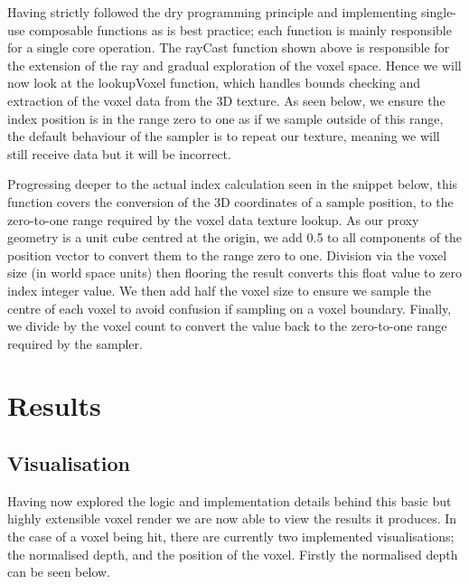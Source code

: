 \documentclass[titlepage]{article}
\begin{document}


Having strictly followed the \gls{dry} programming principle and implementing single-use composable functions as is best practice; each function is mainly responsible for a single core operation. The rayCast function shown above is responsible for the extension of the ray and gradual exploration of the voxel space. Hence we will now look at the lookupVoxel function, which handles bounds checking and extraction of the voxel data from the 3D texture. As seen below, we ensure the index position is in the range zero to one as if we sample outside of this range, the default behaviour of the sampler is to repeat our texture, meaning we will still receive data but it will be incorrect.



Progressing deeper to the actual index calculation seen in the snippet below, this function covers the conversion of the 3D coordinates of a sample position, to the zero-to-one range required by the voxel data texture lookup. As our proxy geometry is a unit cube centred at the origin, we add 0.5 to all components of the position vector to convert them to the range zero to one. Division via the voxel size (in world space units) then flooring the result converts this float value to zero index integer value. We then add half the voxel size to ensure we sample the centre of each voxel to avoid confusion if sampling on a voxel boundary. Finally, we divide by the voxel count to convert the value back to the zero-to-one range required by the sampler.



\section{Results}

\subsection{Visualisation}

Having now explored the logic and implementation details behind this basic but highly extensible voxel render we are now able to view the results it produces. In the case of a voxel being hit, there are currently two implemented visualisations; the normalised depth, and the position of the voxel. Firstly the normalised depth can be seen below.
\end{document}
